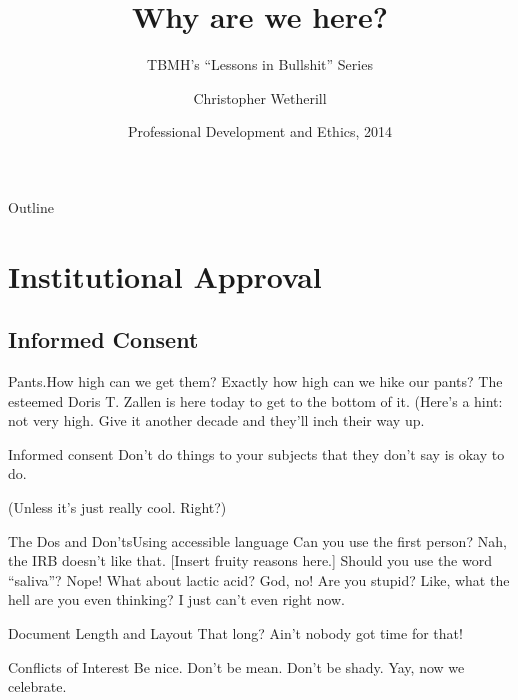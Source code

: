 \documentclass {beamer}
\title{Why are we here?}
\subtitle{TBMH's ``Lessons in Bullshit'' Series}
\author{Christopher Wetherill}
\institute[Virginia Polytechnic Institute and State University] %
{
  \inst{1}%
  Department of Translational Biology, Medicine, and Health\\
  Virginia Polytechnic Institute and State University
}
\date[PDE 2014] %
{Professional Development and Ethics, 2014}
\begin{document}
\begin{frame}
  \titlepage
\end{frame}

\begin{frame}{Outline}
  \tableofcontents
\end{frame}

\section{Institutional Approval}

\subsection{Informed Consent}

\begin{frame}{Pants.}{How high can we get them?}
	Exactly how high can we hike our pants? The esteemed Doris T. Zallen is here today to get to the bottom of it. (Here's a hint: not very high. Give it another decade and they'll inch their way up.
\end{frame}

\begin{frame}{Informed consent}
	Don't do things to your subjects that they don't say is okay to do.\\[0.5cm]
	
	\begin{center}
		(Unless it's just really cool. Right?)
	\end{center}
\end{frame}

\begin{frame}{The Dos and Don'ts}{Using accessible language}
	Can you use the first person? Nah, the IRB doesn't like that. [Insert fruity reasons here.] Should you use the word ``saliva''? Nope! What about lactic acid? God, no! Are you stupid? Like, what the hell are you even thinking? I just can't even right now.
\end{frame}

\begin{frame}{Document Length and Layout}
	That long? Ain't nobody got time for that!
\end{frame}

\begin{frame}{Conflicts of Interest}
	Be nice. Don't be mean. Don't be shady. Yay, now we celebrate.
\end{frame}
\end{document}
